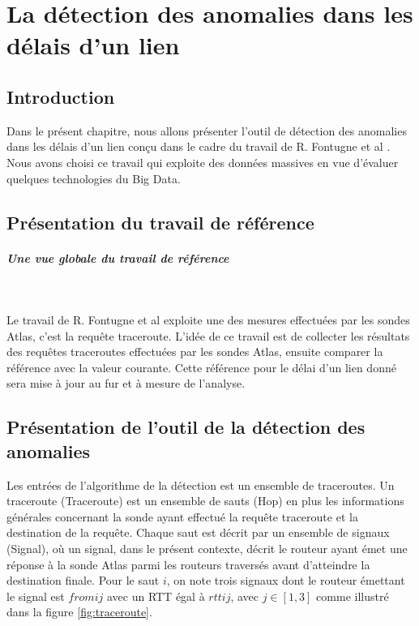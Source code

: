 
\chapter{La détection des anomalies dans les délais d'un lien}

\section{Introduction}

Dans le présent chapitre, nous allons présenter l'outil de détection des anomalies dans les délais d'un lien  conçu dans le cadre du travail de R. Fontugne et al \cite{DBLP:journals/corr/FontugneAPB16}. Nous avons choisi ce travail qui exploite des données massives en vue d'évaluer quelques technologies du Big Data.

\section{Présentation du travail de référence}

\paragraph{Une vue globale du travail de référence}~ 

Le travail de R. Fontugne \cite{DBLP:journals/corr/FontugneAPB16} et al exploite une des mesures effectuées par les sondes Atlas, c'est la requête traceroute. L'idée de ce travail est de collecter les résultats des requêtes traceroutes effectuées par les sondes Atlas, ensuite comparer la référence avec la valeur courante. Cette  référence pour le délai  d'un lien donné   sera mise à jour au fur et à mesure de l'analyse.

\section{Présentation de l'outil de la détection des anomalies }

Les entrées de l'algorithme de la détection est un ensemble de traceroutes. Un traceroute (Traceroute) est un ensemble de sauts (Hop) en plus les informations générales concernant la sonde ayant effectué la requête traceroute et la destination de la requête. Chaque saut est décrit par un ensemble de signaux (Signal), où un signal, dans le présent contexte, décrit le routeur ayant émet une réponse à la sonde Atlas parmi les routeurs traversés avant d'atteindre la destination finale.  Pour le saut $i$, on note trois signaux dont le routeur émettant le signal est $fromij$ avec un RTT égal à $rttij$, avec $j \in [1,3]$ comme illustré dans la figure \ref{fig:traceroute}.

